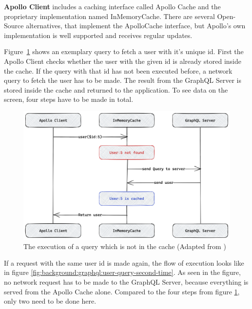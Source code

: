 \bigskip

\noindent \textbf{Apollo Client} includes a caching interface called Apollo Cache and the proprietary implementation named InMemoryCache. There are several Open-Source alternatives, that implement the ApolloCache interface, but Apollo's own implementation is well supported and receives regular updates.

\bigskip

\noindent Figure~\ref{fig:background:graphql:user-query-first-time} shows an exemplary query to fetch a user with it's unique id. First the Apollo Client checks whether the user with the given id is already stored inside the cache. If the query with that id has not been executed before, a network query to fetch the user has to be made. The result from the GraphQL Server is stored inside the cache and returned to the application. To see data on the screen, four steps have to be made in total. \cite{misc:-:background:graphql:apollo-client-cache-overview}

\ifshowImages
\begin{figure}[H]
    \centering
    \includegraphics[width=0.6\linewidth]{images/background/apollo/apollo-client-basic-cache.png}
    \caption{The execution of a query which is not in the cache (Adapted from \cite{misc:-:background:graphql:apollo-client-cache-overview})}\label{fig:background:graphql:user-query-first-time}
\end{figure}
\fi

\noindent If a request with the same user id is made again, the flow of execution looks like in figure \ref{fig:background:graphql:user-query-second-time}. As seen in the figure, no network request has to be made to the GraphQL Server, because everything is served from the Apollo Cache alone. Compared to the four steps from figure \ref{fig:background:graphql:user-query-first-time}, only two need to be done here. \cite{misc:-:background:graphql:apollo-client-cache-overview}

